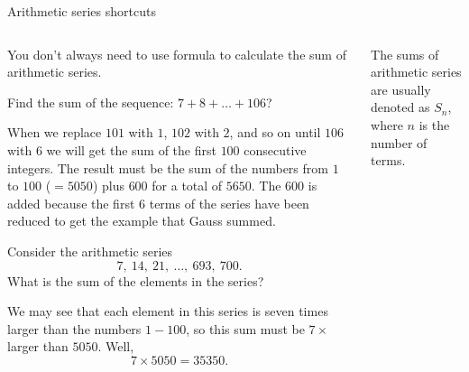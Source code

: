 \documentclass[9pt,aspectratio=169]{beamer}
\begin{document}
\begin{frame}{Arithmetic series shortcuts}
  \begin{columns}[T]
    \begin{column}{0.5\textwidth}
      You don’t always need to use formula to calculate the sum of arithmetic series.
      \begin{problem}
        Find the sum of the sequence: $7 + 8 + \ldots + 106$?
      \end{problem}
      When we replace $101$ with $1$, $102$ with $2$, and so on until $106$ with $6$ we will get the sum of the first $100$ consecutive integers. The result must be the sum of the numbers from $1$ to $100$ ($= 5050$) plus $600$ for a total of $5650$.  The $600$ is added because the first $6$ terms of the series have been reduced to get the example that Gauss summed.
      \begin{problem}
        Consider the arithmetic series 
        \[ 7,\ 14,\ 21,\ \ldots,\ 693,\ 700. \]
        What is the sum of the elements in the series?
      \end{problem}
      We may see that each element in this series is seven times larger than the numbers $1-100$, so this sum must be $7 \times$ larger than $5050$. Well, 
      \[ 7 \times 5050 = 35350. \]
    \end{column}
    \begin{column}{0.5\textwidth}
      The sums of arithmetic series are usually denoted as $S_n$, where $n$ is the number of terms.


\end{column}
\end{columns}
\end{frame}
\end{document}
